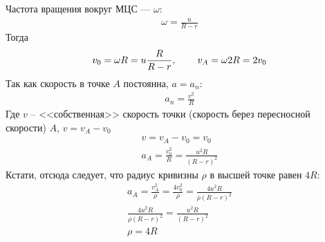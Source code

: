 \documentclass[a5paper,10pt]{article}
\begin{document}
Частота вращения вокруг МЦС --- $\omega$:
\begin{gather*}
	\omega=\frac{u}{R-r}
\end{gather*}
Тогда
\begin{equation*}
	v_0=\omega{R}=u \frac{R}{R-r}, \hspace{5ex} v_A=\omega{2R}=2v_0
\end{equation*}
Так как скорость в точке $A$ постоянна, $a=a_n$:
\begin{gather*}
	a_n=\frac{v^2}{R}
\end{gather*}
Где $v$ -- <<собственная>> скорость точки (скорость берез пересносной скорости) $A$, $v=v_A-v_0$
\begin{gather*}
	v=v_A-v_0=v_0\\
	a_A=\frac{v_0^2}{R}=\frac{u^2R}{(R-r)^2}
\end{gather*}
Кстати, отсюда следует, что радиус кривизны $\rho$ в высшей точке равен $4R$:
\begin{gather*}
	a_A=\frac{v_A^2}{\rho}=
	\frac{4v_0^2}{\rho}=\frac{4u^2R}{\rho(R-r)^2}\\
	\frac{4u^2R}{\rho(R-r)^2}=\frac{u^2R}{(R-r)^2}\\
	\rho=4R
\end{gather*}
\end{document}
